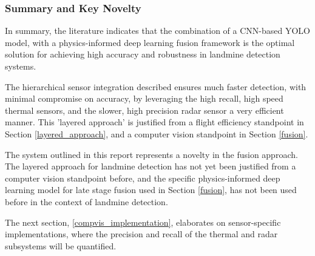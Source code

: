     
    \subsubsection{Summary and Key Novelty}


    
        \noindent In summary, the literature indicates that the combination of a CNN-based YOLO model, with a physics-informed deep learning fusion framework is the optimal solution for achieving high accuracy and robustness in landmine detection systems.

        \noindent The hierarchical sensor integration described ensures much faster detection, with minimal compromise on accuracy, by leveraging the high recall, high speed thermal sensors, and the slower, high precision radar sensor a very efficient manner. This 'layered approach' is justified from a flight efficiency standpoint in Section \ref{layered_approach}, and a computer vision standpoint in Section \ref{fusion}.
            
        \noindent The system outlined in this report represents a novelty in the fusion approach. The layered approach for landmine detection has not yet been justified from a computer vision standpoint before, and the specific physics-informed deep learning model for late stage fusion used in Section \ref{fusion}, has not been used before in the context of landmine detection.

        The next section, \ref{compvis_implementation}, elaborates on sensor-specific implementations, where the precision and recall of the thermal and radar subsystems will be quantified.


            
    
    
